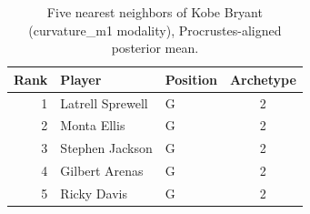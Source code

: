 \begin{table}[htbp]
  \centering\small
  \begin{tabular}{rllc}
    \toprule
    Rank & Player & Position & Archetype \\
    \midrule
    1 & Latrell Sprewell & G & 2 \\
    2 & Monta Ellis & G & 2 \\
    3 & Stephen Jackson & G & 2 \\
    4 & Gilbert Arenas & G & 2 \\
    5 & Ricky Davis & G & 2 \\
    \bottomrule
  \end{tabular}
  \caption{Five nearest neighbors of Kobe Bryant (curvature_m1 modality), Procrustes-aligned posterior mean.}
  \label{tab:Kobe_Bryant_neighbors_curvature_m1}
\end{table}

